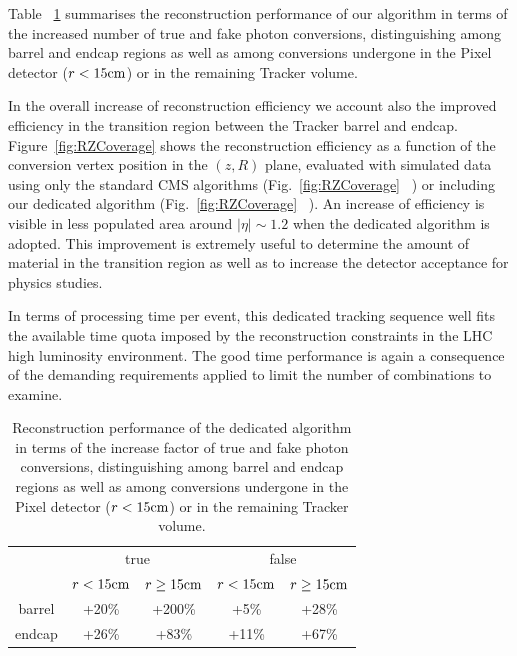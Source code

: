 \documentclass[a4paper]{jpconf}
\begin{document}
 Table ~\ref{tab:perfTable} summarises the reconstruction performance of our algorithm in terms of the increased number of true and fake photon conversions, distinguishing among barrel and endcap regions as well as among conversions undergone in the Pixel detector ($r < 15 \rm cm$) or in the remaining Tracker volume.

In the overall increase of reconstruction efficiency we account also the improved efficiency in the transition region between the Tracker barrel and endcap.  
Figure~\ref{fig:RZCoverage} shows the reconstruction efficiency as a function of the conversion vertex position in the $(z,R)$ plane, evaluated with simulated data using only the standard CMS algorithms (Fig.~\ref{fig:RZCoverage}~ ) or including our dedicated algorithm (Fig.~\ref{fig:RZCoverage}~ ). An increase of efficiency is visible in less populated area around $|\eta| \sim 1.2$ when the dedicated algorithm is adopted. This improvement is extremely useful to determine  the amount of material in the transition region as well as to increase the detector acceptance for physics studies.


In terms of processing time per event, this dedicated tracking sequence well fits the available time quota imposed by the reconstruction constraints in the LHC high luminosity  environment.  The good time performance is again a consequence of the demanding requirements applied to limit the number of combinations to examine.




\begin{table}[htdp]
\caption{Reconstruction performance of the dedicated algorithm in terms of the increase factor of true and fake photon conversions, distinguishing among barrel and endcap regions as well as among conversions undergone in the Pixel detector ($r < 15 \rm cm$) or in the remaining Tracker volume.
}
\begin{center}
\begin{tabular}{c|c|c|c|c}
& \multicolumn{2}{c}{true} & \multicolumn{2}{|c}{false}  \\
& $r < 15 \rm cm$ & $r \ge 15 \rm cm$ & $r < 15 \rm cm$ & $r \ge 15 \rm cm$ \\
\hline
barrel & +20\% & +200\% & +5\% & +28\% \\
\hline
endcap & +26\% & +83\% & +11\% & +67\% 
\end{tabular}
\end{center}
\label{tab:perfTable}
\end{table}%
\end{document}
